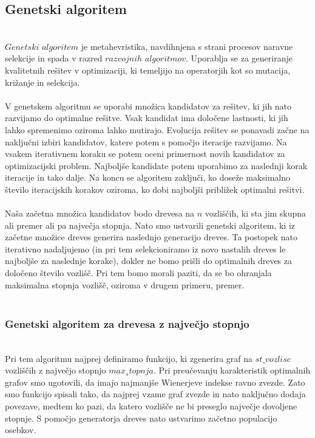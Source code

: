 \documentclass[12pt,a4paper]{amsart}
\theoremstyle{definition} %
\theoremstyle{plain} %
\begin{document}
\subsection{Genetski algoritem}
\
\\
$Genetski$ $algoritem$ je metahevristika, navdihnjena s strani procesov naravne selekcije in spada v razred $razvojnih$
$algoritmov$. Uporablja se za generiranje kvalitetnih rešitev v optimizaciji, ki temeljijo na operatorjih kot so mutacija, križanje
in selekcija.  
\\
\\
V genetskem algoritmu se uporabi množica kandidatov za rešitev, ki jih nato razvijamo do optimalne rešitve. Vsak kandidat
ima določene lastnosti, ki jih lahko spremenimo oziroma lahko mutirajo. Evolucija rešitev se ponavadi začne na naključni izbiri kandidatov,
katere potem s pomočjo iteracije razvijamo. Na vsakem iterativnem koraku se potem oceni primernost novih kandidatov za optimizacijski
problem. Najboljše kandidate potem uporabimo za naslednji korak iteracije in tako dalje. Na koncu se algoritem zaključi,
ko doseže maksimalno število iteracijskih korakov oziroma, ko dobi najboljši približek optimalni rešitvi.
\\
\\
Naša začetna množica kandidatov bodo drevesa na $n$ vozliščih, ki sta jim skupna ali premer ali pa največja stopnja. 
Nato smo ustvarili genetski algoritem, ki iz začetne množice dreves generira naslednjo generacijo dreves. Ta postopek nato iterativno
nadaljujemo (in pri tem selekcioniramo iz novo nastalih dreves le najboljše za naslednje korake), dokler ne bomo prišli do optimalnih 
dreves za določeno število vozlišč. Pri tem bomo morali paziti, da se bo ohranjala maksimalna stopnja vozlišč, 
oziroma v drugem primeru, premer.
\\
\\
\subsubsection{Genetski algoritem za drevesa z največjo stopnjo}
\
\\
Pri tem algoritmu najprej definiramo funkcijo, ki zgenerira graf na $st\_vozlisc$ vozliščih z največjo stopnjo $max_stopnja$.
Pri preučevanju karakteristik optimalnih grafov smo ugotovili, da imajo najmanjše Wienerjeve indekse ravno zvezde. Zato 
smo funkcijo spisali tako, da najprej vzame graf zvezde in nato naključno dodaja povezave, medtem ko pazi, da katero vozlišče
ne bi preseglo največje dovoljene stopnje.
S pomočjo generatorja dreves nato ustvarimo začetno populacijo osebkov.
\end{document}
